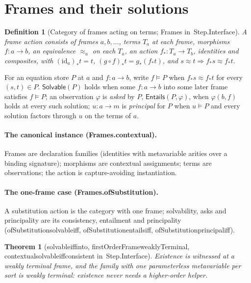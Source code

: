 \documentclass[11pt]{article}
\newtheorem{definition}{Definition}
\newtheorem{theorem}{Theorem}
\theoremstyle{remark}
\newcommand{\lean}[1]{{\ttfamily\def\_{\textunderscore\allowbreak}#1}}
\newcommand{\inmod}[1]{in~{\ttfamily\def\_{\textunderscore\allowbreak}#1}}
\newcommand{\Solv}{\mathsf{Solvable}}
\newcommand{\Ent}{\mathsf{Entails}}
\newcommand{\Mod}{\models}
\begin{document}
\tableofcontents

\section{Frames and their solutions}

\begin{definition}[Category of frames acting on terms; \lean{Frames} \inmod{Step.Interface}]\label{def:frames}
A \emph{frame action} consists of frames $a,b,\dots$, terms $T_a$ at each frame, morphisms
$f : a \to b$, an equivalence $\approx_a$ on each $T_a$, an action $f_* : T_a \to T_b$, identities and
composites, with $(\mathrm{id}_a)_* t = t$, $(g\circ f)_* t = g_*(f_* t)$, and $s \approx t \Rightarrow f_* s \approx f_* t$.
\end{definition}

For an equation store $P$ at $a$ and $f : a \to b$, write $f \Mod P$ when $f_* s \approx f_* t$ for every
$(s,t)\in P$. $\Solv(P)$ holds when some $f : a \to b$ into some later frame satisfies $f\Mod P$; an
observation $\varphi$ is \emph{asked} by $P$, $\Ent(P,\varphi)$, when $\varphi(b,f)$ holds at every such solution;
$u : a\to m$ is \emph{principal} for $P$ when $u\Mod P$ and every solution factors through $u$ on the terms of
$a$.

\paragraph{The canonical instance (\lean{Frames.contextual}).} Frames are declaration families
(identities with metavariable arities over a binding signature); morphisms are contextual
assignments; terms are observations; the action is capture-avoiding instantiation.
\paragraph{The one-frame case (\lean{Frames.ofSubstitution}).} A substitution action is the category
with one frame; solvability, asks and principality are its consistency, entailment and principality
(\lean{ofSubstitution\_solvable\_iff}, \lean{ofSubstitution\_entails\_iff}, \lean{ofSubstitution\_principal\_iff}).

\begin{theorem}[\lean{solvable\_iff\_into}, \lean{firstOrderFrame\_weaklyTerminal}, \lean{contextual\_solvable\_iff\_consistent} \inmod{Step.Interface}]
Existence is witnessed at a weakly terminal frame, and the family with one parameterless metavariable
per sort is weakly terminal: existence never needs a higher-order helper.
\end{theorem}
\end{document}
